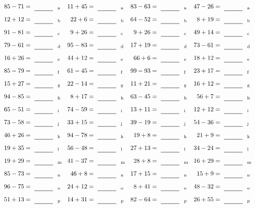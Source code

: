\documentclass
[
  draft    = true,
  fontsize = 11pt,
  parskip  = half-
]
{scrartcl}
\begin{document}
\clearpage
\begin{align*}
    \pline{85-71}&=\rline{a}
  & \pline{11+45}&=\rline{a}
  & \pline{83-63}&=\rline{a}
  & \pline{47-26}&=\rline{a} \\[1ex]
    \pline{12+12}&=\rline{b}
  & \pline{22+6}&=\rline{b}
  & \pline{64-52}&=\rline{b}
  & \pline{8+19}&=\rline{b} \\[1ex]
    \pline{91-81}&=\rline{c}
  & \pline{9+26}&=\rline{c}
  & \pline{9+26}&=\rline{c}
  & \pline{49+14}&=\rline{c} \\[1ex]
    \pline{79-61}&=\rline{d}
  & \pline{95-83}&=\rline{d}
  & \pline{17+19}&=\rline{d}
  & \pline{73-61}&=\rline{d} \\[1ex]
    \pline{16+26}&=\rline{e}
  & \pline{44+12}&=\rline{e}
  & \pline{66+6}&=\rline{e}
  & \pline{18+12}&=\rline{e} \\[1ex]
    \pline{85-79}&=\rline{f}
  & \pline{61-45}&=\rline{f}
  & \pline{99-93}&=\rline{f}
  & \pline{23+17}&=\rline{f} \\[1ex]
    \pline{15+27}&=\rline{g}
  & \pline{22-14}&=\rline{g}
  & \pline{11+21}&=\rline{g}
  & \pline{16+12}&=\rline{g} \\[1ex]
    \pline{94-85}&=\rline{h}
  & \pline{8+17}&=\rline{h}
  & \pline{63-45}&=\rline{h}
  & \pline{56+7}&=\rline{h} \\[1ex]
    \pline{65-51}&=\rline{i}
  & \pline{74-59}&=\rline{i}
  & \pline{13+11}&=\rline{i}
  & \pline{12+12}&=\rline{i} \\[1ex]
    \pline{73-58}&=\rline{j}
  & \pline{33+15}&=\rline{j}
  & \pline{39-19}&=\rline{j}
  & \pline{54-36}&=\rline{j} \\[1ex]
    \pline{46+26}&=\rline{k}
  & \pline{94-78}&=\rline{k}
  & \pline{19+8}&=\rline{k}
  & \pline{21+9}&=\rline{k} \\[1ex]
    \pline{19+35}&=\rline{l}
  & \pline{56-48}&=\rline{l}
  & \pline{27+13}&=\rline{l}
  & \pline{34-24}&=\rline{l} \\[1ex]
    \pline{19+29}&=\rline{m}
  & \pline{41-37}&=\rline{m}
  & \pline{28+8}&=\rline{m}
  & \pline{16+29}&=\rline{m} \\[1ex]
    \pline{85-73}&=\rline{n}
  & \pline{46+8}&=\rline{n}
  & \pline{17+15}&=\rline{n}
  & \pline{15+9}&=\rline{n} \\[1ex]
    \pline{96-75}&=\rline{o}
  & \pline{24+12}&=\rline{o}
  & \pline{8+41}&=\rline{o}
  & \pline{48-32}&=\rline{o} \\[1ex]
    \pline{51+13}&=\rline{p}
  & \pline{14+31}&=\rline{p}
  & \pline{82-64}&=\rline{p}
  & \pline{26+55}&=\rline{p}
\end{align*}
\end{document}
